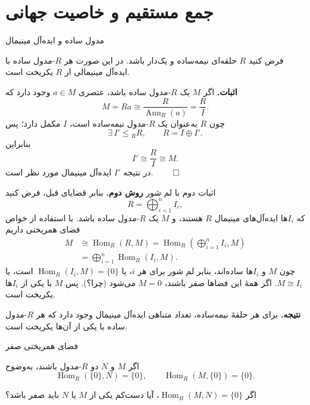 \section{جمع مستقیم و خاصیت جهانی}

\begin{frame}[t]{مدول ساده و ایده‌آل مینیمال}
    \label{lec08:simple-minimal-ideal}
    \begin{theorem}
        فرض کنید $R$ حلقه‌ای نیمه‌ساده و یک‌دار باشد.
        در این صورت هر $R$-مدول ساده با ایده‌آل مینیمالی از $R$ یکریخت است.
    \end{theorem}
    \textbf{اثبات.}
    اگر $M$ یک $R$-مدول ساده باشد، عنصری $a\in M$ وجود دارد که
    \[
        M=Ra\cong\frac{R}{\operatorname{Ann}_R(a)}=\frac{R}{I}.
    \]
    چون $R$ به‌عنوان یک $R$-مدول نیمه‌ساده است، $I$ مکمل دارد؛ پس
    \[
        \exists\, I'\leqslant {}_R R,
        \qquad R=I\oplus I'.
    \]
    بنابراین
    \[
        I'\cong\frac{R}{I}\cong M.
    \]
    در نتیجه $I'$ ایده‌آل مینیمال مورد نظر است.
    \hfill\(\qed\)
\end{frame}

\begin{frame}[t]{اثبات دوم با لم شور}
    \label{lec08:schur-proof}
    \textbf{روش دوم.}
    بنابر قضایای قبل، فرض کنید
    \[
        R=\bigoplus_{i=1}^{n}I_i,
    \]
    که $I_i$ها ایده‌آل‌های مینیمال $R$ هستند، و $M$ یک $R$-مدول ساده باشد.
    با استفاده از خواص فضای همریختی داریم
    \[
        \begin{aligned}
        M&\cong\operatorname{Hom}_R(R,M)
        =\operatorname{Hom}_R\!\left(\bigoplus_{i=1}^{n}I_i,M\right)\\
         &=\bigoplus_{i=1}^{n}\operatorname{Hom}_R(I_i,M).
        \end{aligned}
    \]
    چون $M$ و $I_i$ها ساده‌اند، بنابر لم شور برای هر $i$، یا
    $\operatorname{Hom}_R(I_i,M)=\{0\}$ است، یا $M\cong I_i$.
    اگر همهٔ این فضاها صفر باشند، $M=0$ می‌شود (چرا؟).
    پس $M$ با یکی از $I_i$ها یکریخت است.

    \medskip
    \textbf{نتیجه.}
    برای هر حلقهٔ نیمه‌ساده، تعداد متناهی ایده‌آل مینیمال وجود دارد
    که هر $R$-مدول ساده با یکی از آن‌ها یکریخت است.
\end{frame}

\begin{frame}[t]{فضای همریختی صفر}
    \label{lec08:zero-hom-question}
    \begin{remark}
        اگر $M$ و $N$ دو $R$-مدول باشند، به‌وضوح
        \[
            \operatorname{Hom}_R(\{0\},N)=\{0\},
            \qquad
            \operatorname{Hom}_R(M,\{0\})=\{0\}.
        \]
    \end{remark}
    \begin{question}
        اگر $\operatorname{Hom}_R(M,N)=\{0\}$، آیا دست‌کم یکی از
        $M$ یا $N$ باید صفر باشد؟
    \end{question}
\end{frame}

